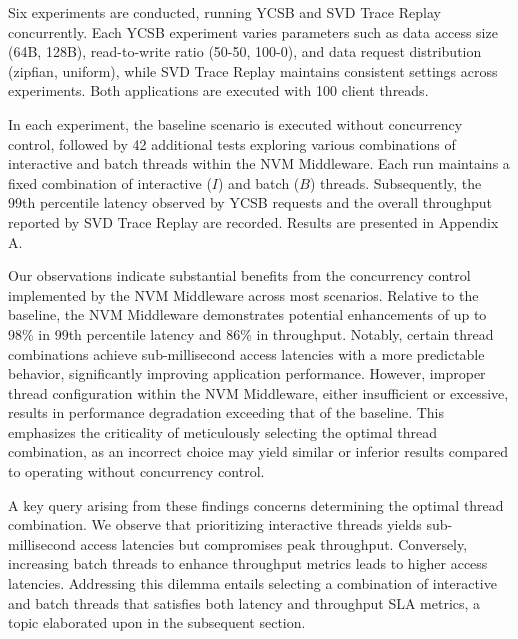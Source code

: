 Six experiments are conducted, running YCSB and SVD Trace Replay concurrently. Each YCSB experiment varies parameters such as data access size (64B, 128B), read-to-write ratio (50-50, 100-0), and data request distribution (zipfian, uniform), while SVD Trace Replay maintains consistent settings across experiments. Both applications are executed with 100 client threads.

In each experiment, the baseline scenario is executed without concurrency control, followed by 42 additional tests exploring various combinations of interactive and batch threads within the NVM Middleware. Each run maintains a fixed combination of interactive ($I$) and batch ($B$) threads. Subsequently, the 99th percentile latency observed by YCSB requests and the overall throughput reported by SVD Trace Replay are recorded. Results are presented in Appendix A.

Our observations indicate substantial benefits from the concurrency control implemented by the NVM Middleware across most scenarios. Relative to the baseline, the NVM Middleware demonstrates potential enhancements of up to 98\% in 99th percentile latency and 86\% in throughput. Notably, certain thread combinations achieve sub-millisecond access latencies with a more predictable behavior, significantly improving application performance. However, improper thread configuration within the NVM Middleware, either insufficient or excessive, results in performance degradation exceeding that of the baseline. This emphasizes the criticality of meticulously selecting the optimal thread combination, as an incorrect choice may yield similar or inferior results compared to operating without concurrency control.

A key query arising from these findings concerns determining the optimal thread combination. We observe that prioritizing interactive threads yields sub-millisecond access latencies but compromises peak throughput. Conversely, increasing batch threads to enhance throughput metrics leads to higher access latencies. Addressing this dilemma entails selecting a combination of interactive and batch threads that satisfies both latency and throughput SLA metrics, a topic elaborated upon in the subsequent section.


